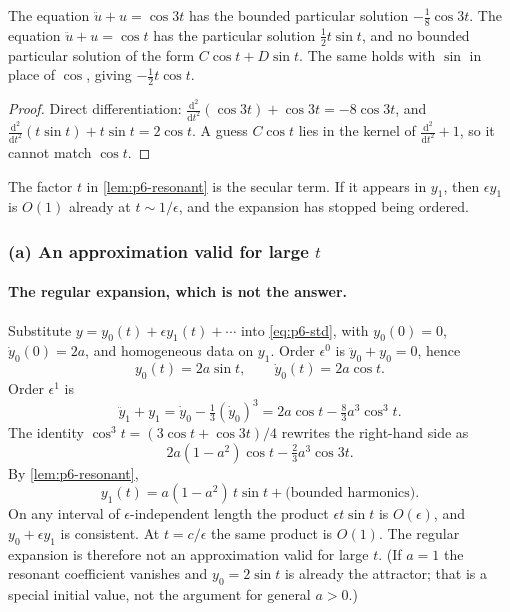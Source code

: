\begin{lemma}
\label{lem:p6-resonant}
The equation \(\ddot u+u=\cos 3t\) has the bounded particular solution \(-\frac18\cos 3t\). The equation \(\ddot u+u=\cos t\) has the particular solution \(\frac12 t\sin t\), and no bounded particular solution of the form \(C\cos t+D\sin t\). The same holds with \(\sin\) in place of \(\cos\), giving \(-\frac12 t\cos t\).
\end{lemma}

\begin{proof}
Direct differentiation: \(\frac{\mathrm{d}^2}{\mathrm{d}t^2}(\cos 3t)+\cos 3t=-8\cos 3t\), and \(\frac{\mathrm{d}^2}{\mathrm{d}t^2}(t\sin t)+t\sin t=2\cos t\). A guess \(C\cos t\) lies in the kernel of \(\frac{\mathrm{d}^2}{\mathrm{d}t^2}+1\), so it cannot match \(\cos t\).
\end{proof}

The factor \(t\) in \cref{lem:p6-resonant} is the secular term. If it appears in \(y_1\), then \(\epsilon y_1\) is \(O(1)\) already at \(t\sim 1/\epsilon\), and the expansion has stopped being ordered.

\subsubsection{(a) An approximation valid for large \(t\)}

\paragraph{The regular expansion, which is not the answer.}

Substitute \(y=y_0(t)+\epsilon y_1(t)+\cdots\) into \eqref{eq:p6-std}, with \(y_0(0)=0\), \(\dot y_0(0)=2a\), and homogeneous data on \(y_1\). Order \(\epsilon^0\) is \(\ddot y_0+y_0=0\), hence
\[
y_0(t)=2a\sin t,
\qquad
\dot y_0(t)=2a\cos t.
\]
Order \(\epsilon^1\) is
\[
\ddot y_1+y_1
=
\dot y_0-\tfrac13(\dot y_0)^3
=
2a\cos t-\tfrac83 a^3\cos^3 t.
\]
The identity \(\cos^3 t=(3\cos t+\cos 3t)/4\) rewrites the right-hand side as
\begin{equation}
\label{eq:p6-y1-rhs}
2a(1-a^2)\cos t-\tfrac23 a^3\cos 3t.
\end{equation}
By \cref{lem:p6-resonant},
\begin{equation}
\label{eq:p6-y1}
y_1(t)
=
a(1-a^2)\,t\sin t
+
\text{(bounded harmonics)}.
\end{equation}
On any interval of \(\epsilon\)-independent length the product \(\epsilon t\sin t\) is \(O(\epsilon)\), and \(y_0+\epsilon y_1\) is consistent. At \(t=c/\epsilon\) the same product is \(O(1)\). The regular expansion is therefore not an approximation valid for large \(t\). (If \(a=1\) the resonant coefficient vanishes and \(y_0=2\sin t\) is already the attractor; that is a special initial value, not the argument for general \(a>0\).)

